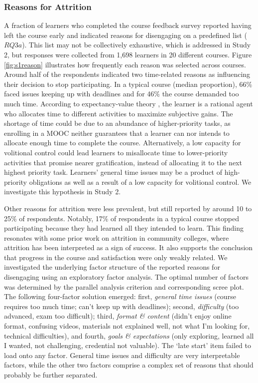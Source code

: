 \documentclass{sigchi}\usepackage[]{graphicx}\usepackage[]{color}
\begin{document}
\subsubsection{Reasons for Attrition}

A fraction of learners who completed the course feedback survey reported having left the course early and indicated reasons for disengaging on a predefined list ($RQ3a$). This list may not be collectively exhaustive, which is addressed in Study 2, but responses were collected from 1,698 learners in 20 different courses. Figure \ref{fig:s1reason} illustrates how frequently each reason was selected across courses. Around half of the respondents indicated two time-related reasons as influencing their decision to stop participating. In a typical course (median proportion), 66\% faced issues keeping up with deadlines and for 46\% the course demanded too much time. According to expectancy-value theory \cite{wigfield2000expectancy}, the learner is a rational agent who allocates time to different activities to maximize subjective gains. The shortage of time could be due to an abundance of higher-priority tasks, as enrolling in a MOOC neither guarantees that a learner can nor intends to allocate enough time to complete the course. Alternatively, a low capacity for volitional control \cite{corno2001volitional} could lead learners to misallocate time to lower-priority activities that promise nearer gratification, instead of allocating it to the next highest priority task. Learners' general time issues may be a product of high-priority obligations as well as a result of a low capacity for volitional control. We investigate this hypothesis in Study 2.

Other reasons for attrition were less prevalent, but still reported by around 10 to 25\% of respondents. Notably, 17\% of respondents in a typical course stopped participating because they had learned all they intended to learn. This finding resonates with some prior work on attrition in community colleges, where attrition has been interpreted as a sign of success. It also supports the conclusion that progress in the course and satisfaction were only weakly related. We investigated the underlying factor structure of the reported reasons for disengaging using an exploratory factor analysis. The optimal number of factors was determined by the parallel analysis criterion and corresponding scree plot. The following four-factor solution emerged: first, {\em general time issues} (course requires too much time; can't keep up with deadlines);  second, {\em difficulty} (too advanced, exam too difficult); third, {\em format \& content} (didn't enjoy online format, confusing videos, materials not explained well, not what I'm looking for, technical difficulties), and fourth, {\em goals \& expectations} (only exploring, learned all I wanted, not challenging, credential not valuable). The `late start' item failed to load onto any factor. General time issues and difficulty are very interpretable factors, while the other two factors comprise a complex set of reasons that should probably be further separated.
\end{document}
